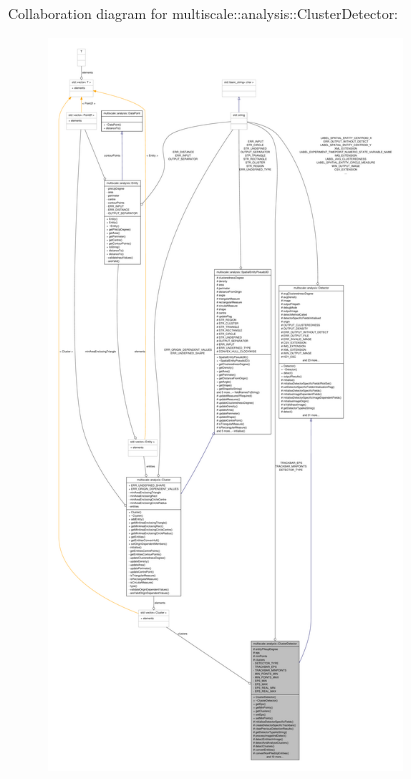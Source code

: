 \-Collaboration diagram for multiscale\-:\-:analysis\-:\-:\-Cluster\-Detector\-:
\nopagebreak
\begin{figure}[H]
\begin{center}
\leavevmode
\includegraphics[height=550pt]{classmultiscale_1_1analysis_1_1ClusterDetector__coll__graph}
\end{center}
\end{figure}
